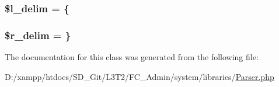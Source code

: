 \subsubsection[{\$l\+\_\+delim}]{\setlength{\rightskip}{0pt plus 5cm}\$l\+\_\+delim = \textquotesingle{}\{\textquotesingle{}}\label{class_c_i___parser_ab957da01a735e612795fba1c5802b1fb}
\hypertarget{class_c_i___parser_a4d80dc6a622989846dbd0e39fde0f3bb}{}
\subsubsection[{\$r\+\_\+delim}]{\setlength{\rightskip}{0pt plus 5cm}\$r\+\_\+delim = \textquotesingle{}\}\textquotesingle{}}\label{class_c_i___parser_a4d80dc6a622989846dbd0e39fde0f3bb}


The documentation for this class was generated from the following file\+:\begin{DoxyCompactItemize}
\item 
D\+:/xampp/htdocs/\+S\+D\+\_\+\+Git/\+L3\+T2/\+F\+C\+\_\+\+Admin/system/libraries/\hyperlink{_parser_8php}{Parser.\+php}\end{DoxyCompactItemize}
